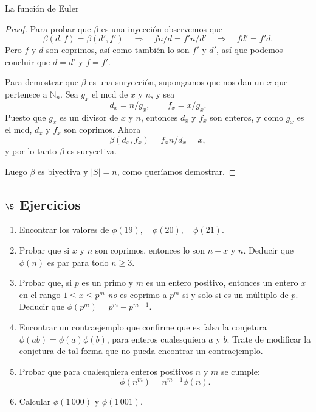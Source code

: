 \begin{section}{La función de Euler}
\begin{proof}
Para probar que $\beta$ es una inyección observemos que
$$
\beta(d,f) = \beta(d',f') \quad \Rightarrow \quad fn/d = f'n/d'
\quad \Rightarrow \quad fd'=f'd.
$$
Pero $f$ y $d$ son coprimos, así como también lo son $f'$ y $d'$,
así que podemos concluir que $d=d'$ y $f=f'$.

Para demostrar que $\beta$ es una suryección, supongamos que nos
dan un $x$ que pertenece a $\mathbb N_n$. Sea $g_x$ el mcd de $x$
y $n$, y sea
$$
d_x = n/g_x, \qquad f_x = x /g_x.
$$
Puesto que $g_x$ es un divisor de $x$ y $n$, entonces $d_x$ y
$f_x$ son enteros, y como $g_x$ es el mcd, $d_x$ y $f_x$ son
coprimos. Ahora
$$
\beta(d_x,f_x) = f_x n/d_x = x,
$$
y por lo tanto $\beta$ es suryectiva.

Luego $\beta$ es biyectiva y $|S|=n$, como queríamos demostrar.
\end{proof}

\subsection*{\Large $\S$ Ejercicios}
\begin{enumerate}
\item Encontrar los valores de $\phi(19),\quad \phi(20),\quad \phi(21)$.

\item Probar que si $x$ y $n$ son coprimos, entonces lo son $n-x$ y
$n$. Deducir que $\phi(n)$ es par para todo $n \ge 3$.

\item Probar que, si $p$ es un primo y $m$ es un entero positivo,
entonces un entero $x$ en el rango $1 \le x \le p^m$ {\it no} es
coprimo a $p^m$ si y solo si es un múltiplo de $p$. Deducir que
$\phi(p^m) = p^m - p^{m-1}$.

\item Encontrar un contraejemplo que confirme que es falsa la conjetura
$\phi(ab)= \phi(a)\phi(b)$, para enteros cualesquiera $a$ y $b$.
Trate de modificar la conjetura de tal forma que no pueda
encontrar un contraejemplo.

\item Probar que para cualesquiera enteros positivos $n$ y $m$ se cumple:
$$
\phi(n^m) =n^{m-1}\phi(n).
$$

\item Calcular $\phi(1\,000)$ y $\phi(1\,001)$.
\end{enumerate}


\end{section}



